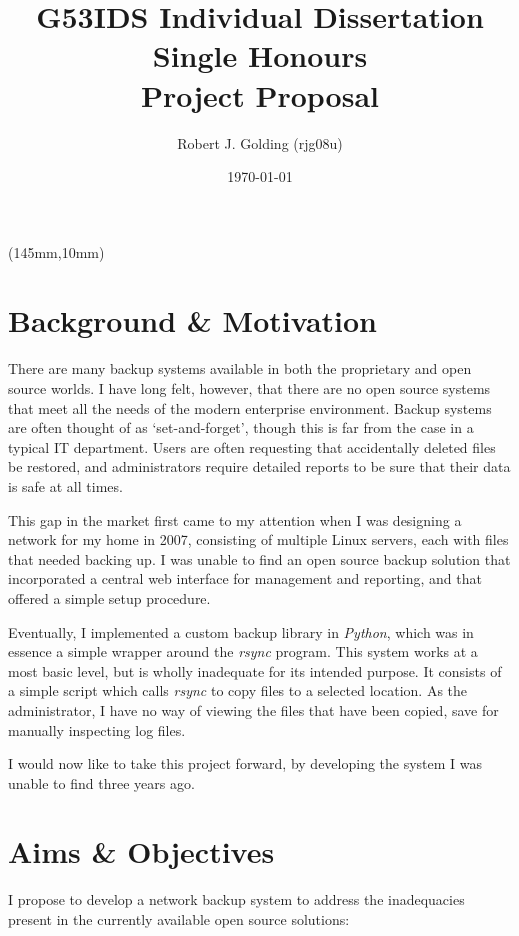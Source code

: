 \documentclass[a4paper]{article}
\title{
    \vspace{5cm}
    \huge{G53IDS Individual Dissertation Single Honours} \\[0.5cm]
    \LARGE{Project Proposal} \\[0.2cm]
}
\author{Robert J. Golding (rjg08u)} \date{\today}
\begin{document}
    \begin{textblock*}{60mm}(145mm,10mm)
        
    \end{textblock*}
    \maketitle
    \thispagestyle{empty}
    \newpage

    \section{Background \& Motivation}

    There are many backup systems available in both the proprietary and open
    source worlds. I have long felt, however, that there are no open source
    systems that meet all the needs of the modern enterprise environment.
    Backup systems are often thought of as `set-and-forget', though this is far
    from the case in a typical IT department. Users are often requesting that
    accidentally deleted files be restored, and administrators require detailed
    reports to be sure that their data is safe at all times.

    This gap in the market first came to my attention when I was designing
    a network for my home in 2007, consisting of multiple Linux servers, each
    with files that needed backing up. I was unable to find an open source
    backup solution that incorporated a central web interface for management
    and reporting, and that offered a simple setup procedure.

    Eventually, I implemented a custom backup library in \emph{Python}, which
    was in essence a simple wrapper around the \emph{rsync} program. This
    system works at a most basic level, but is wholly inadequate for its
    intended purpose. It consists of a simple script which calls \emph{rsync}
    to copy files to a selected location. As the administrator, I have no way
    of viewing the files that have been copied, save for manually inspecting
    log files.

    I would now like to take this project forward, by developing the system
    I was unable to find three years ago.

    \section{Aims \& Objectives}

    I propose to develop a network backup system to address the inadequacies
    present in the currently available open source solutions:
\end{document}
